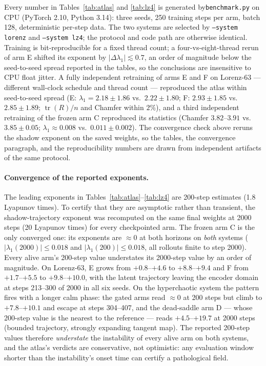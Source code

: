 \documentclass[11pt]{article}
\newcommand{\tr}{\operatorname{tr}}
\begin{document}
Every number in Tables~\ref{tab:atlas} and \ref{tab:lz4} is generated
by\texttt{benchmark.py} on CPU (PyTorch 2.10, Python 3.14): three
seeds, 250 training steps per arm, batch 128, deterministic per-step
data. The two systems are selected by \texttt{--system lorenz} and
\texttt{--system lz4}; the protocol and code path are otherwise
identical. Training is bit-reproducible for a fixed thread count; a
four-vs-eight-thread rerun of arm E shifted its exponent by
$|\Delta\lambda_1|\lesssim0.7$, an order of magnitude below the
seed-to-seed spread reported in the tables, so the conclusions are
insensitive to CPU float jitter. A fully independent retraining of
arms E and F on Lorenz-63 --- different wall-clock schedule and thread
count --- reproduced the atlas within seed-to-seed spread (E:
$\lambda_1=2.18\pm1.86$ vs.\ $2.22\pm1.80$; F: $2.93\pm1.85$ vs.\
$2.85\pm1.89$; $\tr(R)/n$ and Chamfer within $2\%$), and a third
independent retraining of the frozen arm C reproduced its statistics
(Chamfer $3.82$--$3.91$ vs.\ $3.85\pm0.05$; $\lambda_1\approx0.008$
vs.\ $0.011\pm0.002$). The convergence
check above reruns the shadow exponent on the saved weights, so the
tables, the convergence paragraph, and the reproducibility numbers are
drawn from independent artifacts of the same protocol.

\paragraph{Convergence of the reported exponents.}
The leading exponents in Tables~\ref{tab:atlas}--\ref{tab:lz4} are
200-step estimates (1.8 Lyapunov times). To certify that they are
asymptotic rather than transient, the shadow-trajectory exponent was
recomputed on the same final weights at 2000 steps (20 Lyapunov times)
for every checkpointed arm. The frozen arm C is the only converged
one: its exponents are $\approx0$ at both horizons on \emph{both}
systems ($|\lambda_1(2000)|\le0.018$ and $|\lambda_1(200)|\le0.018$,
all rollouts finite to step 2000). Every alive arm's 200-step value
understates its
2000-step value by an order of magnitude. On Lorenz-63, E grows from
$+0.8$--$+4.6$ to $+8.8$--$+9.4$ and F from $+1.7$--$+5.5$ to
$+9.8$--$+10.0$, with the latent trajectory leaving the encoder domain
at steps 213--300 of 2000 in all six seeds. On the hyperchaotic system
the pattern fires with a longer calm phase: the gated arms read
$\approx0$ at 200 steps but climb to $+7.8$--$+10.1$ and escape at
steps 304--407, and the dead-saddle arm D --- whose 200-step value is
the nearest to the reference --- reads $+4.5$--$+19.7$ at 2000 steps
(bounded trajectory, strongly expanding tangent map). The reported
200-step values therefore \emph{understate} the instability of every
alive arm on both systems, and the atlas's verdicts are conservative,
not optimistic: any evaluation window shorter than the instability's
onset time can certify a pathological field.
\end{document}
